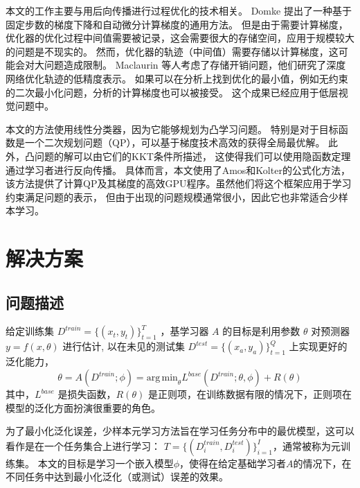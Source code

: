 本文的工作主要与用后向传播进行过程优化的技术相关。
Domke 提出了一种基于固定步数的梯度下降和自动微分计算梯度的通用方法。
但是由于需要计算梯度，优化器的优化过程中间值需要被记录，这会需要很大的存储空间，应用于规模较大
的问题是不现实的。
然而，优化器的轨迹（中间值）需要存储以计算梯度，这可能会对大问题造成限制。
Maclaurin 等人考虑了存储开销问题，他们研究了深度网络优化轨迹的低精度表示。
如果可以在分析上找到优化的最小值，例如无约束的二次最小化问题，分析的计算梯度也可以被接受。
这个成果已经应用于低层视觉问题中。

本文的方法使用线性分类器，因为它能够规划为凸学习问题。
特别是对于目标函数是一个二次规划问题（QP），可以基于梯度技术高效的获得全局最优解。
此外，凸问题的解可以由它们的KKT条件所描述，
这使得我们可以使用隐函数定理通过学习者进行反向传播。
具体而言，本文使用了Amos和Kolter的公式化方法，
该方法提供了计算QP及其梯度的高效GPU程序。虽然他们将这个框架应用于学习约束满足问题的表示，
但由于出现的问题规模通常很小，因此它也非常适合少样本学习。\\

\vspace*{6pt}

\endgroup

\begingroup
\let\clearpage\relax
\chapter{解决方案}
\section{问题描述}
给定训练集 $D^{train} = \{(x_t,y_t)\}^{T}_{t=1}$ ，基学习器 $A$ 的目标是利用参数 $\theta$ 对预测器 $y=f(x,\theta)$ 进行估计,
以在未见的测试集 $D^{test} = \{(x_a, y_a)\}^{Q}_{t=1}$ 上实现更好的泛化能力，
\begin{equation}
    \label{equation:1}
    \theta = A(D^{train}; \phi) = \mathrm{arg\,min}_{\theta}L^{base}(D^{train}; \theta, \phi) + R(\theta)
\end{equation}
其中，$L^{base}$ 是损失函数，$R(\theta)$ 是正则项，在训练数据有限的情况下，正则项在模型的泛化方面扮演很重要的角色。

为了最小化泛化误差，少样本元学习方法旨在学习任务分布中的最优模型，这可以看作是在一个任务集合上进行学习：
$T = \{(D_{i}^{train}, D_{i}^{test})\}^{I}_{i=1}$，通常被称为元训练集。
本文的目标是学习一个嵌入模型$\phi$，使得在给定基础学习者$A$的情况下，在不同任务中达到最小化泛化（或测试）误差的效果。

